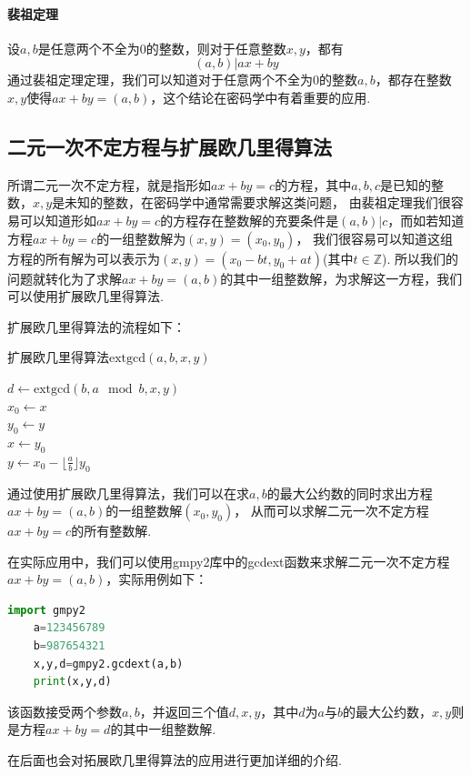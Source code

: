 \documentclass{book}
\numberwithin{equation}{subsubsection}
\begin{document}
\paragraph{\textbf{裴祖定理}}
设$a,b$是任意两个不全为$0$的整数，则对于任意整数$x,y$，都有
\begin{equation}
    (a,b)|ax+by
    \nonumber
\end{equation}
通过裴祖定理定理，我们可以知道对于任意两个不全为$0$的整数$a,b$，都存在整数$x,y$使得$ax+by=(a,b)$，这个结论在密码学中有着重要的应用.\par

\subsection{二元一次不定方程与扩展欧几里得算法}
所谓二元一次不定方程，就是指形如$ax+by=c$的方程，其中$a,b,c$是已知的整数，$x,y$是未知的整数，在密码学中通常需要求解这类问题，
由裴祖定理我们很容易可以知道形如$ax+by=c$的方程存在整数解的充要条件是$(a,b)|c$，而如若知道方程$ax+by=c$的一组整数解为$(x,y)=(x_0,y_0)$，
我们很容易可以知道这组方程的所有解为可以表示为$(x,y)=(x_0-bt,y_0+at)$(其中$t\in \mathbb{Z}$).
所以我们的问题就转化为了求解$ax+by=(a,b)$的其中一组整数解，为求解这一方程，我们可以使用扩展欧几里得算法.\par
扩展欧几里得算法的流程如下：
\begin{algorithm}
    \caption{扩展欧几里得算法$\text{extgcd}(a,b,x,y)$}
    $d\leftarrow \text{extgcd}(b,a\mod b,x,y)$\\
    $x_0\leftarrow x$\\
    $y_0\leftarrow y$\\
    $x\leftarrow y_0$\\
    $y\leftarrow x_0-\lfloor \frac{a}{b}\rfloor y_0$\\
\end{algorithm}\par
通过使用扩展欧几里得算法，我们可以在求$a,b$的最大公约数的同时求出方程$ax+by=(a,b)$的一组整数解$(x_0,y_0)$，
从而可以求解二元一次不定方程$ax+by=c$的所有整数解.\par
在实际应用中，我们可以使用gmpy2库中的gcdext函数来求解二元一次不定方程$ax+by=(a,b)$，实际用例如下：
\begin{lstlisting}[language=Python,basicstyle=\ttfamily,breaklines=true,keywordstyle=\bfseries\color{blue}]
    import gmpy2
    a=123456789
    b=987654321
    x,y,d=gmpy2.gcdext(a,b)
    print(x,y,d)
\end{lstlisting}
该函数接受两个参数$a,b$，并返回三个值$d,x,y$，其中$d$为$a$与$b$的最大公约数，$x,y$则是方程$ax+by=d$的其中一组整数解.\par
在后面也会对拓展欧几里得算法的应用进行更加详细的介绍.\par
\end{document}
